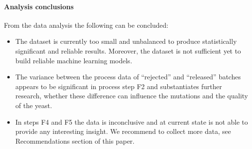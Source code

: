 \paragraph{Analysis conclusions} From the data analysis the following can be concluded:
\begin{itemize}
    \item The dataset is currently too small and unbalanced to produce statistically significant and reliable results. Moreover, the dataset is not sufficient yet to build reliable machine learning models.
    \item The variance between the process data of ``rejected'' and ``released'' batches appears to be significant in process step F2 and substantiates further research, whether these difference can influence the mutations and the quality of the yeast.
    \item In steps F4 and F5 the data is inconclusive and at current state is not able to provide any interesting insight. We recommend to collect more data, see Recommendations section of this paper.
\end{itemize}